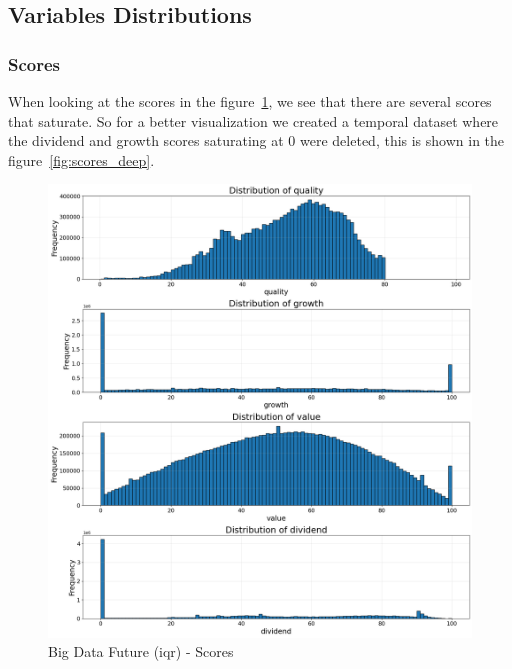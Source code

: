 \documentclass[11pt,english,a4paper,hidelinks]{book}
\begin{document}
\subsection{Variables Distributions}

\subsubsection{Scores}
 When looking at the scores in the figure~\ref{fig:scores}, we see that there are several scores that saturate. So for a better visualization we created a temporal dataset where the dividend and growth scores saturating at 0 were deleted, this is shown in the figure~\ref{fig:scores_deep}. 

\begin{figure}[H]
    \centering
    \begin{minipage}{0.5\textwidth}
        \centering
        \includegraphics[width=\linewidth]{images/code/descriptive analysis/distributions/Big Data future IQR - Scores.png}
        \caption{Big Data Future (\acrshort{iqr}) - Scores}
        \label{fig:scores}
    \end{minipage}\hfill
    \begin{minipage}{0.5\textwidth}
        \centering

\end{minipage}
\end{figure}
\end{document}
